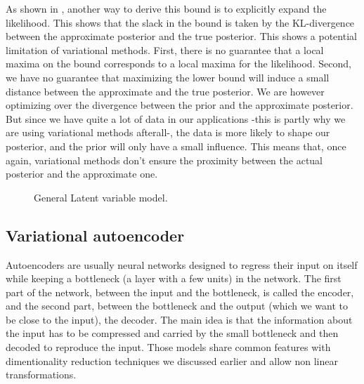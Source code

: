 \documentclass[letterpaper, twoside]{article}
\begin{document}
    As shown in \cite{Kingma.aevb}, another way to derive this bound is to explicitly expand the likelihood. This shows that the slack in the bound is taken by the KL-divergence between the approximate posterior and the true posterior. This shows a potential limitation of variational methods. First, there is no guarantee that a local maxima on the bound corresponds to a local maxima for the likelihood. Second, we have no guarantee that maximizing the lower bound will induce a small distance between the approximate and the true posterior. We are however optimizing over the divergence between the prior and the approximate posterior. But since we have quite a lot of data in our applications -this is partly why we are using variational methods afterall-, the data is more likely to shape our posterior, and the prior will only have a small influence. This means that, once again, variational methods don't ensure the proximity between the actual posterior and the approximate one.



    \begin{figure}
    \centering
    \caption{General Latent variable model.}
    \label{latentvargraph}
    \end{figure}



  \subsection{Variational autoencoder}
    Autoencoders are usually neural networks designed to regress their input on itself while keeping a bottleneck (a layer with a few units) in the network. The first part of the network, between the input and the bottleneck, is called the encoder, and the second part, between the bottleneck and the output (which we want to be close to the input), the decoder. The main idea is that the information about the input has to be compressed and carried by the small bottleneck and then decoded to reproduce the input. Those models share common features with dimentionality reduction techniques we discussed earlier and allow non linear transformations.\\
\end{document}
